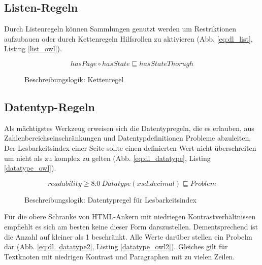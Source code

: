 \documentclass[runningheads,a4paper]{llncs}
\begin{document}


\subsection{Listen-Regeln}
\label{sec:rule_list}

Durch Listenregeln können Sammlungen genutzt werden um Restriktionen aufzubauen oder durch Kettenregeln Hilfsrollen zu aktivieren (Abb. \ref{eq:dl_list}, Listing \ref{list_owl}).

\begin{figure}
\begin{equation}
hasPage \circ hasState \sqsubseteq hasStateThorugh
\label{eq:dl_list}
\end{equation}
\caption{Beschreibungslogik: Kettenregel}
\end{figure}



\subsection{Datentyp-Regeln}
\label{sec:rule_datatype}

Als mächtigstes Werkzeug erweisen sich die Datentypregeln, die es erlauben, aus Zahlenbereichseinschränkungen und Datentypdefinitionen Probleme abzuleiten. 
Der Lesbarkeitsindex einer Seite sollte einen definierten Wert nicht überschreiten um nicht als zu komplex zu gelten (Abb. \ref{eq:dl_datatype}, Listing \ref{datatype_owl}).


\begin{figure}
\begin{equation}
readability \geq 8.0\ Datatype(\textit{xsd:decimal}) \sqsubseteq Problem
\label{eq:dl_datatype}
\end{equation}
\caption{Beschreibungslogik: Datentypregel für Lesbarkeitsindex}
\end{figure}



Für die obere Schranke von HTML-Ankern mit niedriegen Kontrastverhältnissen empfiehlt es sich am besten keine dieser Form darszustellen.
Dementsprechend ist die Anzahl auf kleiner als 1 beschränkt.
Alle Werte darüber stellen ein Probelm dar (Abb. \ref{eq:dl_datatype2}, Listing \ref{datatype_owl2}).
Gleiches gilt für Textknoten mit niedrigen Kontrast und Paragraphen mit zu vielen Zeilen.
\end{document}
